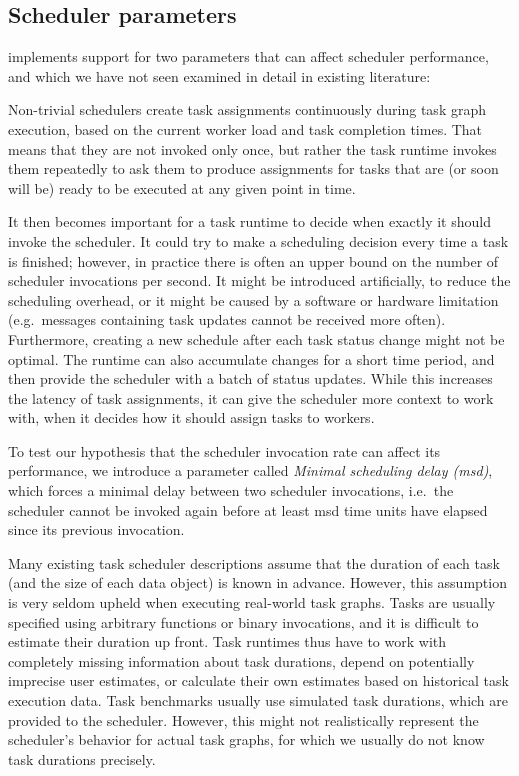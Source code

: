 \subsection{Scheduler parameters}
\estee{} implements support for two parameters that can affect scheduler
performance, and which we have not seen examined in detail in existing literature:
\begin{description}[wide=0pt]
	\item[Minimal scheduling delay] Non-trivial schedulers create task assignments continuously during task graph execution, based on
		the current worker load and task completion times. That means that they are not invoked only once,
		but rather the task runtime invokes them repeatedly to ask them to produce assignments for tasks
		that are (or soon will be) ready to be executed at any given point in time.

		It then becomes important for a task runtime to decide when exactly it should invoke the scheduler.
		It could try to make a scheduling decision every time a task is finished; however, in practice
		there is often an upper bound on the number of scheduler invocations per second. It might be
		introduced artificially, to reduce the scheduling overhead, or it might be caused by a software or
		hardware limitation (e.g.\ messages containing task updates cannot be received more often).
		Furthermore, creating a new schedule after each task status change might not be optimal. The
		runtime can also accumulate changes for a short time period, and then provide the scheduler with a
		batch of status updates. While this increases the latency of task assignments, it can give the
		scheduler more context to work with, when it decides how it should assign tasks to workers.

		To test our hypothesis that the scheduler invocation rate can affect its performance, we introduce
		a parameter called \emph{Minimal scheduling delay (\acrshort{msd})}, which forces a minimal delay between two scheduler
		invocations, i.e.\ the scheduler cannot be invoked again before at least \gls{msd}
		time units have elapsed since its previous invocation.
	\item[Information mode] Many existing task scheduler descriptions assume that the duration of each task (and the size of
		each data object) is known in advance. However, this assumption is very seldom upheld when
		executing real-world task graphs. Tasks are usually specified using arbitrary functions or binary
		invocations, and it is difficult to estimate their duration up front. Task runtimes thus have to
		work with completely missing information about task durations, depend on potentially imprecise user
		estimates, or calculate their own estimates based on historical task execution data. Task
		benchmarks usually use simulated task durations, which are provided to the scheduler. However, this
		might not realistically represent the scheduler's behavior for actual task graphs, for which we
		usually do not know task durations precisely.


\end{description}
